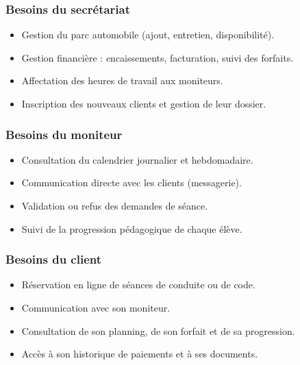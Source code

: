 \documentclass[12pt,a4paper]{article}
\begin{document}
\subsubsection{Besoins du secrétariat}

\begin{itemize}[leftmargin=*,itemsep=4pt]
    \item Gestion du parc automobile (ajout, entretien, disponibilité).
    \item Gestion financière : encaissements, facturation, suivi des forfaits.
    \item Affectation des heures de travail aux moniteurs.
    \item Inscription des nouveaux clients et gestion de leur dossier.
\end{itemize}

\subsubsection{Besoins du moniteur}

\begin{itemize}[leftmargin=*,itemsep=4pt]
    \item Consultation du calendrier journalier et hebdomadaire.
    \item Communication directe avec les clients (messagerie).
    \item Validation ou refus des demandes de séance.
    \item Suivi de la progression pédagogique de chaque élève.
\end{itemize}

\subsubsection{Besoins du client}

\begin{itemize}[leftmargin=*,itemsep=4pt]
    \item Réservation en ligne de séances de conduite ou de code.
    \item Communication avec son moniteur.
    \item Consultation de son planning, de son forfait et de sa progression.
    \item Accès à son historique de paiements et à ses documents.
\end{itemize}

\newpage

\end{document}
